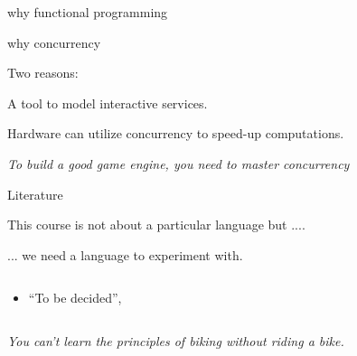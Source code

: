 \begin{frame}{why functional programming}

\end{frame}

\begin{frame}{why concurrency}

Two reasons:

\pause\vspace{20pt}\hspace{60pt}A tool to model interactive services.

\pause\vspace{20pt}\hspace{60pt}Hardware can utilize concurrency to speed-up computations.

\pause\vspace{40pt}
{\em To build a good game engine, you need to master concurrency}

\end{frame}


\begin{frame}{Literature}

  This course is not about a particular language but .... \pause

  \vspace{20pt}\hspace{40pt} ... we need a language to experiment with.

\pause
\begin{columns}
 \begin{column}{0.6\linewidth}
  \begin{itemize}
    \item ``To be decided'', 
  \end{itemize}
 \end{column}
 \begin{column}{0.4\linewidth}

 \end{column}
\end{columns}

  \vspace{20pt}\hspace{40pt} {\em You can't learn the principles of biking without riding a bike.}


\end{frame}


